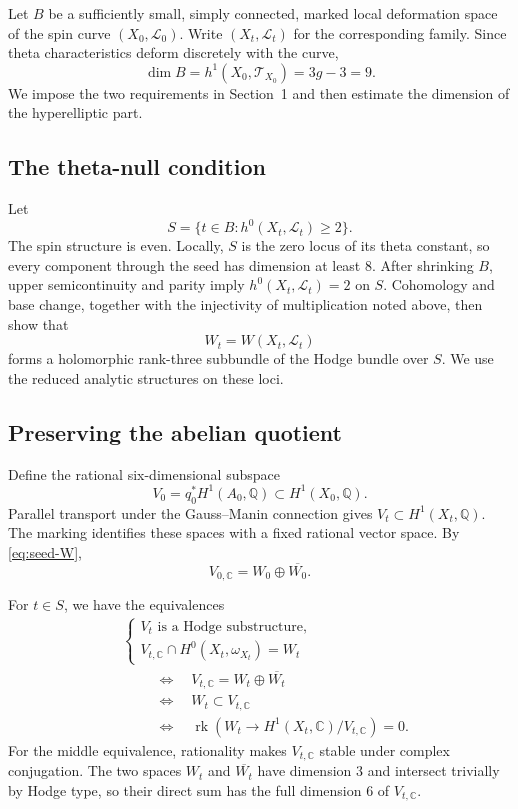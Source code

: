\documentclass[11pt]{amsart}
\theoremstyle{remark}
\DeclareMathOperator{\rk}{rk}
\newcommand{\Q}{\mathbb Q}
\newcommand{\CC}{\mathbb C}
\newcommand{\LL}{\mathcal L}
\numberwithin{equation}{section}
\begin{document}
Let $B$ be a sufficiently small, simply connected, marked local
deformation space of the spin curve $(X_0,\LL_0)$. Write
$(X_t,\LL_t)$ for the corresponding family. Since theta characteristics
deform discretely with the curve,
\[
\dim B=h^1(X_0,\mathcal T_{X_0})=3g-3=9.
\]
We impose the two requirements in Section~1 and then estimate the
dimension of the hyperelliptic part.

\subsection{The theta-null condition}
Let
\[
S=\{t\in B:h^0(X_t,\LL_t)\geq2\}.
\]
The spin structure is even. Locally, $S$ is the zero locus of its theta
constant, so every component through the seed has dimension at least
$8$. After shrinking $B$, upper semicontinuity and parity imply
$h^0(X_t,\LL_t)=2$ on $S$. Cohomology and base change, together with the
injectivity of multiplication noted above, then show that
\[
W_t=W(X_t,\LL_t)
\]
forms a holomorphic rank-three subbundle of the Hodge bundle over $S$.
We use the reduced analytic structures on these loci.

\subsection{Preserving the abelian quotient}
Define the rational six-dimensional subspace
\[
V_0=q_0^*H^1(A_0,\Q)\subset H^1(X_0,\Q).
\]
Parallel transport under the Gauss--Manin connection gives
$V_t\subset H^1(X_t,\Q)$. The marking identifies these spaces with a
fixed rational vector space. By \eqref{eq:seed-W},
\[
V_{0,\CC}=W_0\oplus\overline{W_0}.
\]

For $t\in S$, we have the equivalences
\begin{equation}\label{eq:hodge}
\begin{aligned}
&\left\{\begin{array}{l}
V_t\text{ is a Hodge substructure},\\
V_{t,\CC}\cap H^0(X_t,\omega_{X_t})=W_t
\end{array}\right.\\
&\hspace{1cm}\Longleftrightarrow\quad
V_{t,\CC}=W_t\oplus\overline{W_t}\\
&\hspace{1cm}\Longleftrightarrow\quad W_t\subset V_{t,\CC}\\
&\hspace{1cm}\Longleftrightarrow\quad
\rk\!\left(W_t\longrightarrow H^1(X_t,\CC)/V_{t,\CC}\right)=0.
\end{aligned}
\end{equation}
For the middle equivalence, rationality makes $V_{t,\CC}$ stable under
complex conjugation. The two spaces $W_t$ and $\overline{W_t}$ have
dimension $3$ and intersect trivially by Hodge type, so their direct
sum has the full dimension $6$ of $V_{t,\CC}$.
\end{document}
